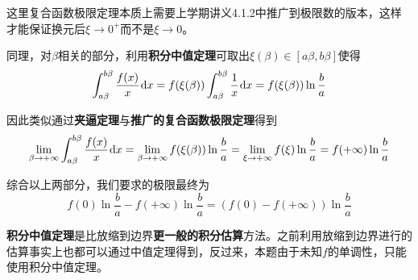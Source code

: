 \documentclass[a4paper,UTF8,fontset=windows,AutoFakeBold]{ctexart}
\newcommand*{\dr}{\hspace{0.07em}\mathrm{d}}
\newcommand*{\note}{\noindent *}
\theoremstyle{ex}
\begin{document}
\begin{framed}
{\begin{itemize}
        \note 这里复合函数极限定理本质上需要上学期讲义4.1.2中推广到极限数的版本，这样才能保证换元后$\xi\to0^+$而不是$\xi\to0$。

        同理，对$\beta$相关的部分，利用\textbf{积分中值定理}可取出$\xi(\beta)\in[a\beta,b\beta]$使得
        $$\int_{a\beta}^{b\beta}\frac{f(x)}{x}\dr x=f(\xi(\beta))\int_{a\beta}^{b\beta}\frac{1}{x}\dr x=f(\xi(\beta))\ln\frac{b}{a}$$

        因此类似通过\textbf{夹逼定理}与\textbf{推广的复合函数极限定理}得到
        $$\lim_{\beta\to+\infty}\int_{a\beta}^{b\beta}\frac{f(x)}{x}\dr x=\lim_{\beta\to+\infty}f(\xi(\beta))\ln\frac{b}{a}=\lim_{\xi\to+\infty}f(\xi)\ln\frac{b}{a}=f(+\infty)\ln\frac{b}{a}$$

        综合以上两部分，我们要求的极限最终为
        $$f(0)\ln\frac{b}{a}-f(+\infty)\ln\frac{b}{a}=(f(0)-f(+\infty))\ln\frac{b}{a}$$
    \end{itemize}
}
\end{framed}

\note \textbf{积分中值定理}是比放缩到边界\textbf{更一般的积分估算}方法。之前利用放缩到边界进行的估算事实上也都可以通过中值定理得到，反过来，本题由于未知$f$的单调性，只能使用积分中值定理。
\end{document}
